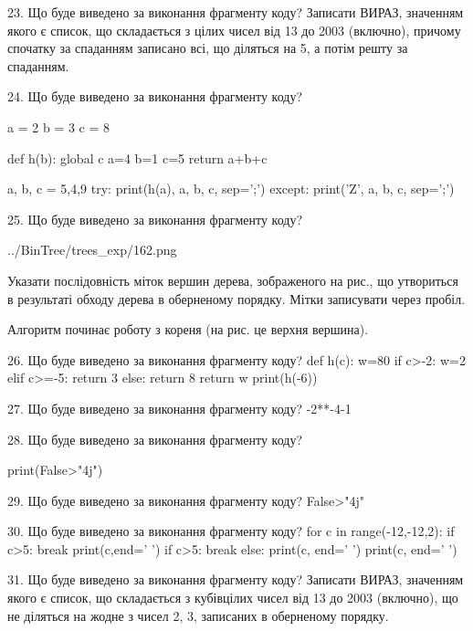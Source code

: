 \documentclass[11pt]{article}
\begin{document}

23. Що буде виведено за виконання фрагменту коду?
Записати ВИРАЗ, значенням якого є список, що складається з цілих чисел від 13 до 2003 (включно), причому спочатку за спаданням записано всі, що діляться на 5, а потім решту за спаданням.


24. Що буде виведено за виконання фрагменту коду?

a = 2
b = 3
c = 8

def h(b):
global c    a=4
    b=1
    c=5
    return a+b+c

a, b, c = 5,4,9
try:
    print(h(a), a, b, c, sep=';')
except:
    print('Z', a, b, c, sep=';')


25. Що буде виведено за виконання фрагменту коду?

\begin{center}
	{../BinTree/trees_exp/162.png}
\end{center}
Указати послідовність міток вершин дерева, зображеного на рис., що утвориться в результаті обходу дерева в оберненому порядку. Мітки записувати через пробіл.\par Алгоритм починає роботу з кореня (на рис. це верхня вершина).


26. Що буде виведено за виконання фрагменту коду?
def h(c):
      w=80
      if c>-2: w=2
      elif c>=-5: return 3
      else: return 8
      return w
   print(h(-6))

27. Що буде виведено за виконання фрагменту коду?
-2**-4-1

28. Що буде виведено за виконання фрагменту коду?

print(False>"4j")


29. Що буде виведено за виконання фрагменту коду?
False>"4j"

30. Що буде виведено за виконання фрагменту коду?
for c in range(-12,-12,2):
    if c>5:
        break
        print(c,end=' ')
    if c>5:
        break
else:
    print(c, end=' ')
print(c, end=' ')


31. Що буде виведено за виконання фрагменту коду?
Записати ВИРАЗ, значенням якого є список, що складається з кубівцілих чисел від 13 до 2003 (включно), що не діляться на жодне з чисел 2, 3, записаних в обернено\-му порядку.
\end{document}
